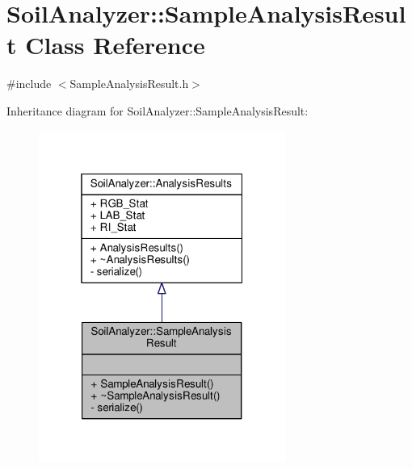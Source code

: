 \hypertarget{class_soil_analyzer_1_1_sample_analysis_result}{}\section{Soil\+Analyzer\+:\+:Sample\+Analysis\+Result Class Reference}
\label{class_soil_analyzer_1_1_sample_analysis_result}


{\ttfamily \#include $<$Sample\+Analysis\+Result.\+h$>$}



Inheritance diagram for Soil\+Analyzer\+:\+:Sample\+Analysis\+Result\+:\nopagebreak
\begin{figure}[H]
\begin{center}
\leavevmode
\includegraphics[width=229pt]{class_soil_analyzer_1_1_sample_analysis_result__inherit__graph}
\end{center}
\end{figure}



